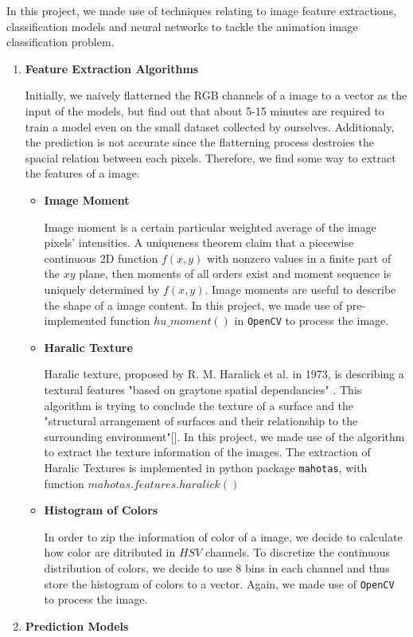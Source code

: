 \documentclass[11.5pt]{article}
\begin{document}
    In this project, we made use of techniques relating to image feature extractions, classification models and neural networks to tackle the animation image classification problem.

    \begin{enumerate}
        \item \textbf{Feature Extraction Algorithms}

        Initially, we naively flatterned the RGB channels of a image to a vector as the input of the models, but find out that about 5-15 minutes are required to train a model even on the small dataset collected by ourselves. Additionaly, the prediction is not accurate since the flatterning process destroies the spacial relation between each pixels. Therefore, we find some way to extract the features of a image.
        \begin{itemize}
            \item \textbf{Image Moment}

            Image moment is a certain particular weighted average of the image pixels' intensities. A uniqueness theorem \cite{img_moment} claim that a piecewise continuous 2D function $f(x,y)$ with nonzero values in a finite part of the $xy$ plane, then moments of all orders exist and moment sequence is uniquely determined by $f(x,y)$. Image moments are useful to describe the shape of a image content. In this project, we made use of pre-implemented function $hu\_moment()$ in \texttt{OpenCV}\cite{opencv_library} to process the image.
            \item \textbf{Haralic Texture}

            Haralic texture, proposed by R. M. Haralick et al. in 1973, is describing a textural features "based on graytone spatial dependancies" \cite{haralick}. This algorithm is trying to conclude the texture of a surface and the "structural arrangement of surfaces and their relationship to the surrounding environment"[]. In this project, we made use of the algorithm to extract the texture information of the images. The extraction of Haralic Textures is implemented in python package \texttt{mahotas}\cite{mahotas}, with function $mahotas.features.haralick()$
            \item \textbf{Histogram of Colors}

            In order to zip the information of color of a image, we decide to calculate how color are ditributed in $HSV$ channels. To discretize the continuous distribution of colors, we decide to use 8 bins in each channel and thus store the histogram of colors to a vector. Again, we made use of \texttt{OpenCV}\cite{opencv_library} to process the image.
        \end{itemize}
        \item \textbf{Prediction Models}


\end{enumerate}
\end{document}
